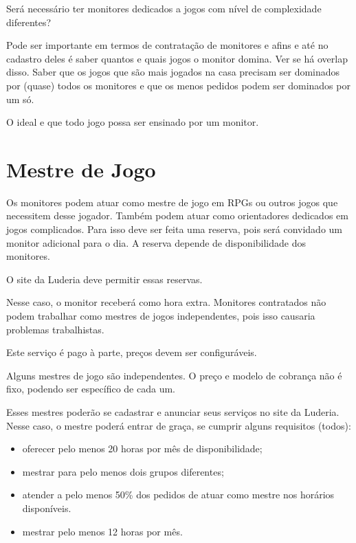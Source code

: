 Será necessário ter monitores dedicados a jogos com nível de complexidade diferentes? 


Pode ser importante em termos de contratação de monitores e afins e até no cadastro deles é saber quantos e quais jogos o monitor domina. Ver se há overlap disso. Saber que os jogos que são mais jogados na casa precisam ser dominados por (quase) todos os monitores e que os menos pedidos podem ser dominados por um só. 

O ideal e que todo jogo possa ser ensinado por um monitor.


\section{Mestre de Jogo}

Os monitores podem atuar como mestre de jogo em RPGs ou outros jogos que necessitem desse jogador. Também podem atuar como orientadores dedicados em jogos complicados.
Para isso deve ser feita uma reserva, pois será convidado um monitor adicional para o dia. A reserva depende de disponibilidade dos monitores.

O site da Luderia deve permitir essas reservas. 

Nesse caso, o monitor receberá como hora extra. Monitores contratados não podem trabalhar como mestres de jogos independentes, pois isso causaria problemas trabalhistas. 

Este serviço é pago à parte, preços devem ser configuráveis.

Alguns mestres de jogo são independentes. O preço e modelo de cobrança não é fixo, podendo ser específico de cada um. 

Esses  mestres poderão se cadastrar e anunciar seus serviços no site da Luderia. Nesse caso, o mestre poderá entrar de graça, se cumprir alguns requisitos (todos):
\begin{itemize}
    \item oferecer pelo menos 20 horas por mês de disponibilidade;
    \item mestrar para pelo menos dois grupos diferentes;
    \item atender a pelo menos 50\% dos pedidos de atuar como mestre nos horários disponíveis.
    \item mestrar pelo menos 12 horas por mês.
\end{itemize}

